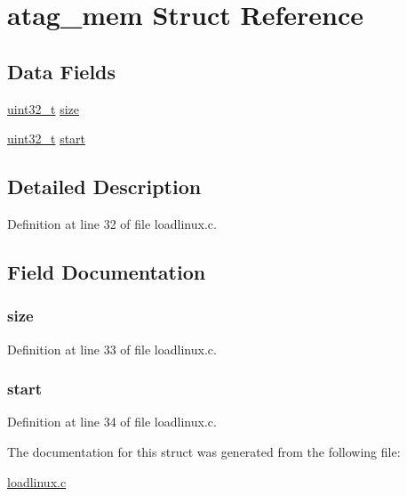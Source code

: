 \hypertarget{structatag__mem}{\section{atag\-\_\-mem \-Struct \-Reference}
\label{structatag__mem}
}
\subsection*{\-Data \-Fields}
\begin{DoxyCompactItemize}
\item 
\hyperlink{arch__types_8h_a435d1572bf3f880d55459d9805097f62}{uint32\-\_\-t} \hyperlink{structatag__mem_ab2c6b258f02add8fdf4cfc7c371dd772}{size}
\item 
\hyperlink{arch__types_8h_a435d1572bf3f880d55459d9805097f62}{uint32\-\_\-t} \hyperlink{structatag__mem_a61eb63d26b2fa6c2971603ceccffb14b}{start}
\end{DoxyCompactItemize}


\subsection{\-Detailed \-Description}


\-Definition at line 32 of file loadlinux.\-c.



\subsection{\-Field \-Documentation}
\hypertarget{structatag__mem_ab2c6b258f02add8fdf4cfc7c371dd772}{
\subsubsection[{size}]{ {\bf size}}}\label{structatag__mem_ab2c6b258f02add8fdf4cfc7c371dd772}


\-Definition at line 33 of file loadlinux.\-c.

\hypertarget{structatag__mem_a61eb63d26b2fa6c2971603ceccffb14b}{
\subsubsection[{start}]{ {\bf start}}}\label{structatag__mem_a61eb63d26b2fa6c2971603ceccffb14b}


\-Definition at line 34 of file loadlinux.\-c.



\-The documentation for this struct was generated from the following file\-:\begin{DoxyCompactItemize}
\item 
\hyperlink{loadlinux_8c}{loadlinux.\-c}\end{DoxyCompactItemize}
